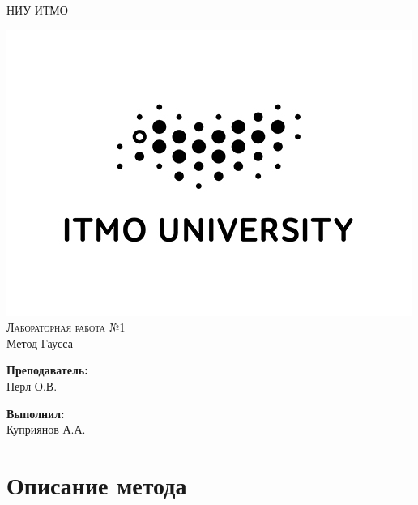 \documentclass[12pt,letterpaper]{article}
\author{Arthur Kupriyanov}
\begin{document}
\begin{titlepage}
 
\begin{center}

{\Large {НИУ ИТМО} }
 
\includegraphics[scale=1]{bw_eng.jpg}
\\[1cm]

{\Huge \textsc{Лабораторная работа №1}}\\[0.7cm]
{\Huge Метод Гаусса}\\[2cm]

\begin{minipage}[l]{0.4\textwidth}
	\begin{flushleft}
		\textbf{\textsf{Преподаватель:}}\\
		\large Перл О.В.\\ 

		\end{flushleft}
\end{minipage}
\begin{minipage}[l]{0.4\textwidth}

	\begin{flushright}
		\textbf{\textsf{Выполнил:}}\\
		\linespread{1}
		\large Куприянов А.А.\\
	\end{flushright}
\end{minipage}
 
\end{center}
 
\end{titlepage}


\section*{Описание метода}
\end{document}
